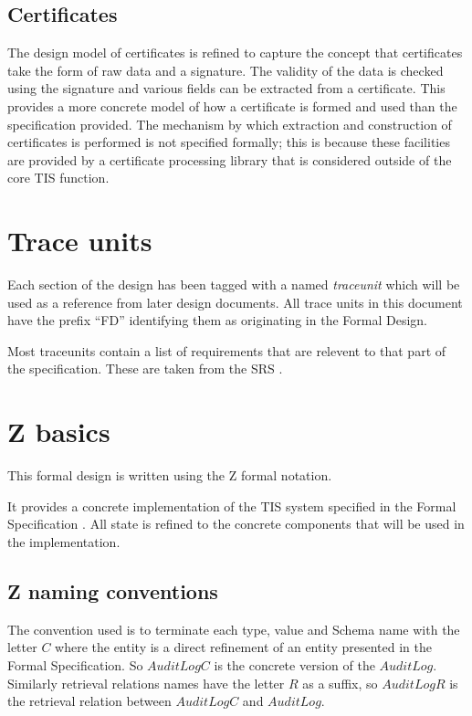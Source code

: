 \subsection{Certificates}
The design model of certificates is refined to capture the concept
that certificates take the form of raw data and a signature. The
validity of the data is checked using the signature and various fields
can be extracted from a certificate. This provides a more concrete
model of how a certificate is formed and used than the specification
provided. The mechanism by which extraction and construction of
certificates is performed is not specified formally; this is because
these facilities are provided by a certificate processing library that
is considered outside of the core TIS function. 

\section{Trace units}
Each section of the design has been tagged with a named {\em
traceunit} which will be used as a reference from later design
documents. All trace units in this document have the prefix ``FD''
identifying them as originating in the Formal Design.

Most traceunits contain a list of requirements that are relevent to
that part of the specification. These are taken from the SRS
\cite{SRS}.  
\section{Z basics}
This formal design is written using the Z formal notation. 

It provides a concrete implementation of the TIS system specified in
the Formal Specification \cite{FS}. All state is refined to the
concrete components that will be used in the implementation. 

\subsection{Z naming conventions}
The convention used is to terminate each type, value and Schema name
with the letter $C$  where the entity is a direct refinement of an
entity presented in the Formal Specification. So $AuditLogC$ is the
concrete version of the $AuditLog$. Similarly retrieval relations
names have the letter $R$ as a suffix, so $AuditLogR$ is the retrieval
relation between $AuditLogC$ and $AuditLog$.

